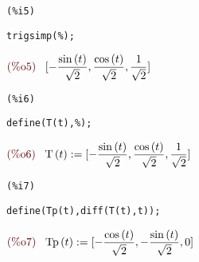 \documentclass[12pt]{article}
\begin{document}
\noindent
\begin{minipage}[t]{8ex}{\color{red}\bf
\begin{verbatim}
(%i5) 
\end{verbatim}}
\end{minipage}
\begin{minipage}[t]{\textwidth}{\color{blue}
\begin{verbatim}
trigsimp(%);
\end{verbatim}}
\end{minipage}
\begin{math}\displaystyle
\parbox{8ex}{\color{labelcolor}(\%o5) }
[-\frac{\mathrm{sin}\left( t\right) }{\sqrt{2}},\frac{\mathrm{cos}\left( t\right) }{\sqrt{2}},\frac{1}{\sqrt{2}}]
\end{math}


\noindent
\begin{minipage}[t]{8ex}{\color{red}\bf
\begin{verbatim}
(%i6) 
\end{verbatim}}
\end{minipage}
\begin{minipage}[t]{\textwidth}{\color{blue}
\begin{verbatim}
define(T(t),%);
\end{verbatim}}
\end{minipage}
\begin{math}\displaystyle
\parbox{8ex}{\color{labelcolor}(\%o6) }
\mathrm{T}\left( t\right) :=[-\frac{\mathrm{sin}\left( t\right) }{\sqrt{2}},\frac{\mathrm{cos}\left( t\right) }{\sqrt{2}},\frac{1}{\sqrt{2}}]
\end{math}


\noindent
\begin{minipage}[t]{8ex}{\color{red}\bf
\begin{verbatim}
(%i7) 
\end{verbatim}}
\end{minipage}
\begin{minipage}[t]{\textwidth}{\color{blue}
\begin{verbatim}
define(Tp(t),diff(T(t),t));
\end{verbatim}}
\end{minipage}
\begin{math}\displaystyle
\parbox{8ex}{\color{labelcolor}(\%o7) }
\mathrm{Tp}\left( t\right) :=[-\frac{\mathrm{cos}\left( t\right) }{\sqrt{2}},-\frac{\mathrm{sin}\left( t\right) }{\sqrt{2}},0]
\end{math}
\end{document}
